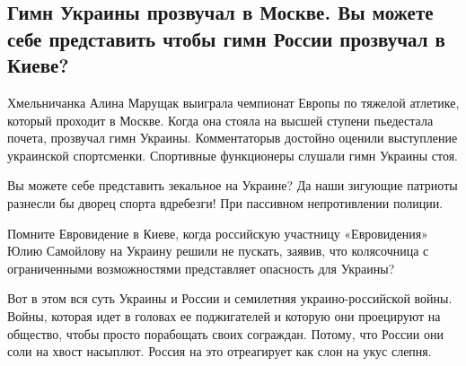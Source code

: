  
 
 
 
 

\subsection{Гимн Украины прозвучал в Москве. Вы можете себе представить чтобы гимн России прозвучал в Киеве?}
\label{sec:10_04_2021.fb.berdnik_miroslava.1.moskva_sport_zoloto_ukraina_atletika_maruschak_alina}

Хмельничанка Алина Марущак выиграла чемпионат Европы по тяжелой атлетике,
который проходит в Москве. Когда она стояла на высшей ступени пьедестала
почета, прозвучал гимн Украины. Комментаторыв достойно оценили выступление
украинской спортсменки. Спортивные функционеры слушали гимн Украины стоя.

Вы можете себе представить зекальное на Украине?  Да наши зигующие патриоты
разнесли бы дворец спорта вдребезги!  При пассивном непротивлении полиции.

Помните Евровидение в Киеве, когда российскую участницу «Евровидения» Юлию
Самойлову на Украину решили не пускать, заявив, что колясочница с ограниченными
возможностями  представляет опасность для Украины?

Вот в этом вся суть Украины и России  и семилетняя украино-российской войны.
Войны, которая идет в головах ее поджигателей и которую они проецируют на
общество, чтобы просто порабощать своих сограждан. Потому, что России они соли
на хвост насыплют.  Россия на это отреагирует как слон на укус слепня.
